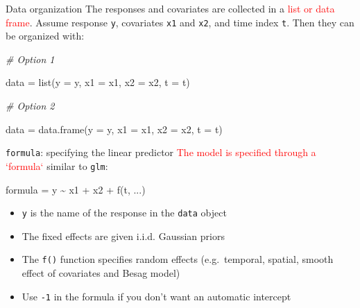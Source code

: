 \documentclass[
  ignorenonframetext,
]{beamer}
\newenvironment{Shaded}{\begin{snugshade}}{\end{snugshade}}
\newcommand{\AttributeTok}[1]{\textcolor[rgb]{0.77,0.63,0.00}{#1}}
\newcommand{\CommentTok}[1]{\textcolor[rgb]{0.56,0.35,0.01}{\textit{#1}}}
\newcommand{\FunctionTok}[1]{\textcolor[rgb]{0.00,0.00,0.00}{#1}}
\newcommand{\NormalTok}[1]{#1}
\newcommand{\OtherTok}[1]{\textcolor[rgb]{0.56,0.35,0.01}{#1}}
\newcommand{\SpecialCharTok}[1]{\textcolor[rgb]{0.00,0.00,0.00}{#1}}
\begin{document}
\begin{frame}[fragile]{Data organization}
\protect\hypertarget{data-organization}{}
The responses and covariates are collected in a
\textcolor{red}{list or data frame}. Assume response \texttt{y},
covariates \texttt{x1} and \texttt{x2}, and time index \texttt{t}. Then
they can be organized with:

\begin{Shaded}
\begin{Highlighting}[]
\CommentTok{\# Option 1}

\NormalTok{data }\OtherTok{=} \FunctionTok{list}\NormalTok{(}\AttributeTok{y =}\NormalTok{ y, }\AttributeTok{x1 =}\NormalTok{ x1, }\AttributeTok{x2 =}\NormalTok{ x2, }\AttributeTok{t =}\NormalTok{ t)}

\CommentTok{\# Option 2}

\NormalTok{data }\OtherTok{=} \FunctionTok{data.frame}\NormalTok{(}\AttributeTok{y =}\NormalTok{ y, }\AttributeTok{x1 =}\NormalTok{ x1, }\AttributeTok{x2 =}\NormalTok{ x2, }\AttributeTok{t =}\NormalTok{ t)}
\end{Highlighting}
\end{Shaded}
\end{frame}

\begin{frame}[fragile]{\texttt{formula}: specifying the linear
predictor}
\protect\hypertarget{formula-specifying-the-linear-predictor}{}
\textcolor{red}{The model is specified through a `formula`} similar to
\texttt{glm}:

\begin{Shaded}
\begin{Highlighting}[]
\NormalTok{formula }\OtherTok{=}\NormalTok{ y }\SpecialCharTok{\textasciitilde{}}\NormalTok{ x1 }\SpecialCharTok{+}\NormalTok{ x2 }\SpecialCharTok{+} \FunctionTok{f}\NormalTok{(t, ...)}
\end{Highlighting}
\end{Shaded}

\begin{itemize}
\item
  \texttt{y} is the name of the response in the \texttt{data} object
\item
  The fixed effects are given i.i.d. Gaussian priors
\item
  The \texttt{f()} function specifies random effects (e.g.~temporal,
  spatial, smooth effect of covariates and Besag model)
\item
  Use \texttt{-1} in the formula if you don't want an automatic
  intercept
\end{itemize}
\end{frame}
\end{document}
